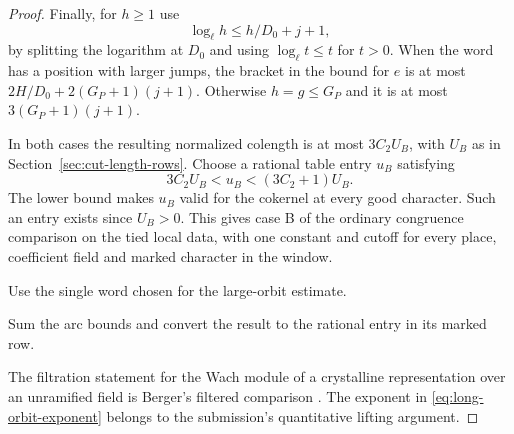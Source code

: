 \begin{proof}
Finally, for \(h\ge1\) use
\[
 \log_\ell h\le h/D_0+j+1,
\]
by splitting the logarithm at
\(D_0\) and using \(\log_\ell t\le t\) for \(t>0\).
When the word has a position with larger jumps, the bracket in the bound for
\(e\) is at most \(2H/D_0+2(G_P+1)(j+1)\). Otherwise \(h=g\le G_P\)
and it is at most \(3(G_P+1)(j+1)\).

In both cases the resulting
normalized colength is at most \(3C_2 U_B\), with \(U_B\) as in
Section~\ref{sec:cut-length-rows}. Choose a rational table entry \(u_B\) satisfying
\[
 3C_2U_B<u_B<(3C_2+1)U_B.
\]
The lower bound makes \(u_B\) valid for the cokernel at every good character. Such an entry exists since \(U_B>0\).
This gives case B of the ordinary congruence comparison on the
tied local data, with one constant and cutoff for every place,
coefficient field and marked character in the window.

Use the single word chosen for the large-orbit estimate.

Sum the arc bounds and convert the result to the rational entry in its marked row.
\label{cor:inert-long-orbit-1}

The filtration statement for the Wach module
of a crystalline representation over an unramified field is
Berger's filtered comparison \cite[Corollary III.4.5]{berger-wach}.
The exponent in \eqref{eq:long-orbit-exponent} belongs to the
submission's quantitative lifting argument.
\end{proof}

